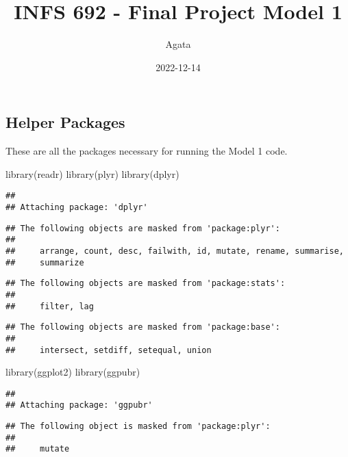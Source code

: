 \documentclass[
]{article}
\title{INFS 692 - Final Project Model 1}
\author{Agata}
\date{2022-12-14}
\newenvironment{Shaded}{\begin{snugshade}}{\end{snugshade}}
\newcommand{\FunctionTok}[1]{\textcolor[rgb]{0.00,0.00,0.00}{#1}}
\newcommand{\NormalTok}[1]{#1}
\begin{document}
\maketitle

\hypertarget{helper-packages}{%
\subsection{Helper Packages}\label{helper-packages}}

These are all the packages necessary for running the Model 1 code.

\begin{Shaded}
\begin{Highlighting}[]
\FunctionTok{library}\NormalTok{(readr)}
\FunctionTok{library}\NormalTok{(plyr)}
\FunctionTok{library}\NormalTok{(dplyr)}
\end{Highlighting}
\end{Shaded}

\begin{verbatim}
## 
## Attaching package: 'dplyr'
\end{verbatim}

\begin{verbatim}
## The following objects are masked from 'package:plyr':
## 
##     arrange, count, desc, failwith, id, mutate, rename, summarise,
##     summarize
\end{verbatim}

\begin{verbatim}
## The following objects are masked from 'package:stats':
## 
##     filter, lag
\end{verbatim}

\begin{verbatim}
## The following objects are masked from 'package:base':
## 
##     intersect, setdiff, setequal, union
\end{verbatim}

\begin{Shaded}
\begin{Highlighting}[]
\FunctionTok{library}\NormalTok{(ggplot2)}
\FunctionTok{library}\NormalTok{(ggpubr)}
\end{Highlighting}
\end{Shaded}

\begin{verbatim}
## 
## Attaching package: 'ggpubr'
\end{verbatim}

\begin{verbatim}
## The following object is masked from 'package:plyr':
## 
##     mutate
\end{verbatim}
\end{document}
